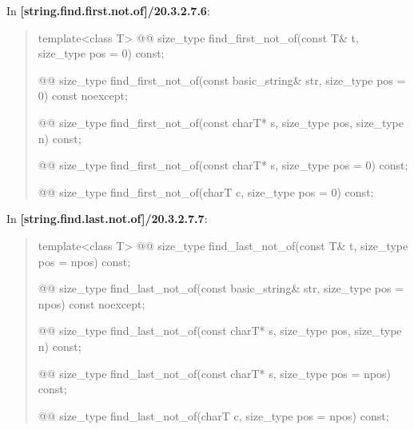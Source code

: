 \documentclass{wg21}
\begin{document}
In \textbf{[string.find.first.not.of]/20.3.2.7.6}:
\begin{quote}
\begin{itemdecl}
template<class T>
  @@ size_type find_first_not_of(const T& t, size_type pos = 0) const;
\end{itemdecl}

\begin{itemdecl}
@@ size_type find_first_not_of(const basic_string& str, size_type pos = 0) const noexcept;
\end{itemdecl}

\begin{itemdecl}
@@ size_type find_first_not_of(const charT* s, size_type pos, size_type n) const;
\end{itemdecl}

\begin{itemdecl}
@@ size_type find_first_not_of(const charT* s, size_type pos = 0) const;
\end{itemdecl}

\begin{itemdecl}
@@ size_type find_first_not_of(charT c, size_type pos = 0) const;
\end{itemdecl}
\end{quote}

In \textbf{[string.find.last.not.of]/20.3.2.7.7}:
\begin{quote}
\begin{itemdecl}
template<class T>
  @@
  size_type find_last_not_of(const T& t, size_type pos = npos) const;
\end{itemdecl}

\begin{itemdecl}
@@
size_type find_last_not_of(const basic_string& str, size_type pos = npos) const noexcept;
\end{itemdecl}

\begin{itemdecl}
@@
size_type find_last_not_of(const charT* s, size_type pos, size_type n) const;
\end{itemdecl}

\begin{itemdecl}
@@
size_type find_last_not_of(const charT* s, size_type pos = npos) const;
\end{itemdecl}

\begin{itemdecl}
@@
size_type find_last_not_of(charT c, size_type pos = npos) const;
\end{itemdecl}
\end{quote}
\end{document}
